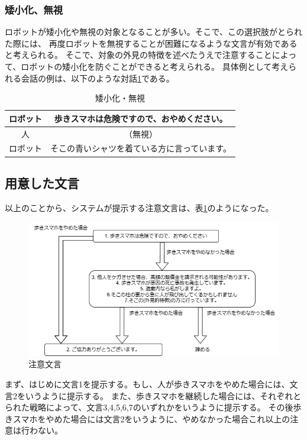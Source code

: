 \documentclass[11pt,a4j]{jreport}
\begin{document}
\subsubsection{矮小化、無視}
ロボットが矮小化や無視の対象となることが多い\cite{Schneider2022}。そこで、この選択肢がとられた際には、
再度ロボットを無視することが困難になるような文言が有効であると考えられる。
そこで、対象の外見の特徴を述べたうえで注意することによって、ロボットの矮小化を防ぐことができると考えられる。
具体例として考えられる会話の例は、以下のような対話\ref{dialogue: Ignore}である。
\begin{table}[H]
  \centering
  
  
  \begin{tabular}{c|c}
      ロボット & 歩きスマホは危険ですので、おやめください。 \\ \hline
      人 & （無視） \\ \hline
      ロボット & そこの青いシャツを着ている方に言っています。 \\ 
  \end{tabular}
  \caption{矮小化・無視}
  \label{dialogue: Ignore}
\end{table}


\subsection{用意した文言}
以上のことから、システムが提示する注意文言は、表\ref{fig: Strategy}のようになった。
\begin{figure}[h]
  
  \includegraphics[width=15cm]{img/waystostop.drawio.png}
  \caption{注意文言}
  \label{fig: Strategy}

\end{figure}
まず、はじめに文言1を提示する。もし、人が歩きスマホをやめた場合には、文言2をいうように提示する。
また、歩きスマホを継続した場合には、それぞれとられた戦略によって、文言3,4,5,6,7のいずれかをいうように提示する。
その後歩きスマホをやめた場合には文言2をいうように、やめなかった場合これ以上の注意は行わない。
\end{document}
